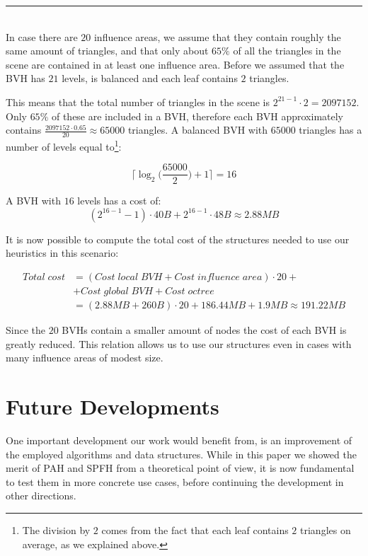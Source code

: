 \documentclass[acmtog, anonymous, review]{acmart}
\begin{document}
\noindent\rule{0.5\textwidth}{0.49pt}\\
In case there are $20$ influence areas, we assume that they contain roughly the same amount of triangles, and that only about $65\%$ of all the triangles in the scene are contained in at least one influence area. Before we assumed that the BVH has $21$ levels, is balanced and each leaf contains $2$ triangles. 

This means that the total number of triangles in the scene is $2^{21-1} \cdot 2 = 2097152$. Only $65\%$ of these are included in a BVH, therefore each BVH approximately contains $\frac{2097152\cdot0.65}{20} \approx 65000$ triangles. A balanced BVH with $65000$ triangles has a number of levels equal to\footnote{The division by $2$ comes from the fact that each leaf contains $2$ triangles on average, as we explained above.}:

$$\Big\lceil\log_2\Big(\frac{65000}{2}\Big)+1\Big\rceil = 16$$ 

A BVH with $16$ levels has a cost of:
$$
(2^{16-1}-1) \cdot 40B + 2^{16-1} \cdot 48B \approx 2.88MB
$$

It is now possible to compute the total cost of the structures needed to use our heuristics in this scenario:

\begin{subequations}
	\begin{align*}
		Total\;cost &= (Cost\;local\;BVH + Cost\;influence\;area) \cdot 20 +\\ &+ Cost\;global\;BVH + Cost\;octree\\
		&= (2.88MB + 260B) \cdot 20 + 186.44MB + 1.9MB \approx 191.22MB
	\end{align*}
\end{subequations}

Since the $20$ BVHs contain a smaller amount of nodes the cost of each BVH is greatly reduced. This relation allows us to use our structures even in cases with many influence areas of modest size.

\section{Future Developments} \label{sec:future_developments}
One important development our work would benefit from, is an improvement of the employed algorithms and data structures. While in this paper we showed the merit of PAH and SPFH from a theoretical point of view, it is now fundamental to test them in more concrete use cases, before continuing the development in other directions.
\end{document}
